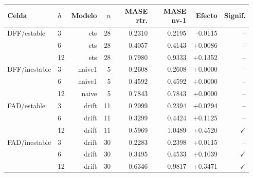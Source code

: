 \small
\begin{tabular}{llrrrrrr}
\toprule
Celda & $h$ & Modelo & $n$ & MASE rtr. & MASE nv-1 & Efecto & Signif. \\
\midrule
DFF/estable & 3 & ets & 28 & 0.2310 & 0.2195 & -0.0115 & -- \\
 & 6 & ets & 28 & 0.4057 & 0.4143 & +0.0086 & -- \\
 & 12 & ets & 28 & 0.7980 & 0.9333 & +0.1352 & -- \\
DFF/inestable & 3 & naive1 & 5 & 0.2608 & 0.2608 & +0.0000 & -- \\
 & 6 & naive1 & 5 & 0.4592 & 0.4592 & +0.0000 & -- \\
 & 12 & naive & 5 & 0.7843 & 0.7843 & +0.0000 & -- \\
FAD/estable & 3 & drift & 11 & 0.2099 & 0.2394 & +0.0294 & -- \\
 & 6 & drift & 11 & 0.3299 & 0.4424 & +0.1125 & -- \\
 & 12 & drift & 11 & 0.5969 & 1.0489 & +0.4520 & $\checkmark$ \\
FAD/inestable & 3 & drift & 30 & 0.2283 & 0.2398 & +0.0115 & -- \\
 & 6 & drift & 30 & 0.3495 & 0.4533 & +0.1039 & $\checkmark$ \\
 & 12 & drift & 30 & 0.6346 & 0.9817 & +0.3471 & $\checkmark$ \\
\bottomrule
\end{tabular}
